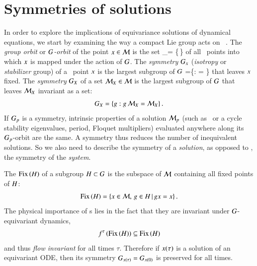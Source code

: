 \documentclass[preprint,number,sort&compress]{elsarticle}
\begin{document}
\section{\label{s:symSol} Symmetries of solutions}

In order to explore the implications of equivariance 
solutions of dynamical equations,  we start by examining the
way a compact Lie group acts on  \statesp\ \pS. The
\emph{group orbit} or \emph{$G$-orbit} of the point
$x \in {\cal M}$ is the set
\beq
    \pS_\ssp = \{\LieEl\,\ssp \mid \LieEl \in {\Group}\}
of all \statesp\ points into which $\ssp$ is mapped under the
action of $\Group$.
The \emph{symmetry} $\stab{\ssp}$ (\emph{isotropy} or
\emph{stabilizer} group) of a \statesp\ point $\ssp$ is the
largest subgroup of $\Group$
\beq
\stab{\ssp} =\{\LieEl \in \Group: \LieEl \ssp = \ssp \}
that leaves $\ssp$ fixed.
The \emph{symmetry} $\stab{X}$ of a set $\pS_X \in \pS$ is
the largest subgroup  of $\Group$ that leaves $\pS_X$
invariant as a set:
\[
	\stab{X}= \{\LieEl: \LieEl \, \pS_X = \pS_X\}
\,.
\]
If $G_{p}$ is a symmetry, intrinsic properties of a
solution ${\cal M}_p$ (such as \eqv\ or a cycle stability
eigenvalues, period, Floquet multipliers) evaluated anywhere
along its $G_{p}$-orbit are the same. A symmetry thus
reduces the number of inequivalent solutions. So we also need
to describe the symmetry of a \emph{solution}, as opposed to
, the symmetry of the \emph{system}.

The \emph{\fixedsp} $\mathrm{Fix}\left(H\right)$ of a subgroup
$H\subset G$ is the subspace of ${\cal M}$ containing
all fixed points of $H$:
\[
	\mathrm{Fix}\left(H\right)=
      \{x\in{\cal M},\,g\in H \,|\,
        g x = x \}
\,.
\]
The physical importance of \fixedsp s lies in the fact that
they are invariant under $G$-equivariant
dynamics,
\[
 f^\tau\left(\mathrm{Fix}\left(H\right)\right)\subseteq \mathrm{Fix}\left(H\right)
\]
and thus \emph{flow invariant} for all times $\tau$.
Therefore if $x(\tau)$ is a solution of an equivariant ODE,
then its symmetry $G_{x(\tau)}=G_{x(0)}$ is
preserved for all times.
\end{document}
